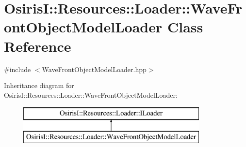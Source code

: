 \hypertarget{class_osiris_i_1_1_resources_1_1_loader_1_1_wave_front_object_model_loader}{\section{Osiris\-I\-:\-:Resources\-:\-:Loader\-:\-:Wave\-Front\-Object\-Model\-Loader Class Reference}
\label{class_osiris_i_1_1_resources_1_1_loader_1_1_wave_front_object_model_loader}
}


{\ttfamily \#include $<$Wave\-Front\-Object\-Model\-Loader.\-hpp$>$}

Inheritance diagram for Osiris\-I\-:\-:Resources\-:\-:Loader\-:\-:Wave\-Front\-Object\-Model\-Loader\-:\begin{figure}[H]
\begin{center}
\leavevmode
\includegraphics[height=2.000000cm]{class_osiris_i_1_1_resources_1_1_loader_1_1_wave_front_object_model_loader}
\end{center}
\end{figure}
